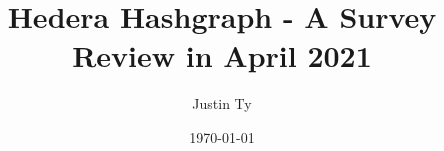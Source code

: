 \documentclass{article}
\begin{document}

\author{Justin Ty}
\title{Hedera Hashgraph - A Survey Review in April 2021 }
\date{\today}

\maketitle






\printbibliography

\end{document}
